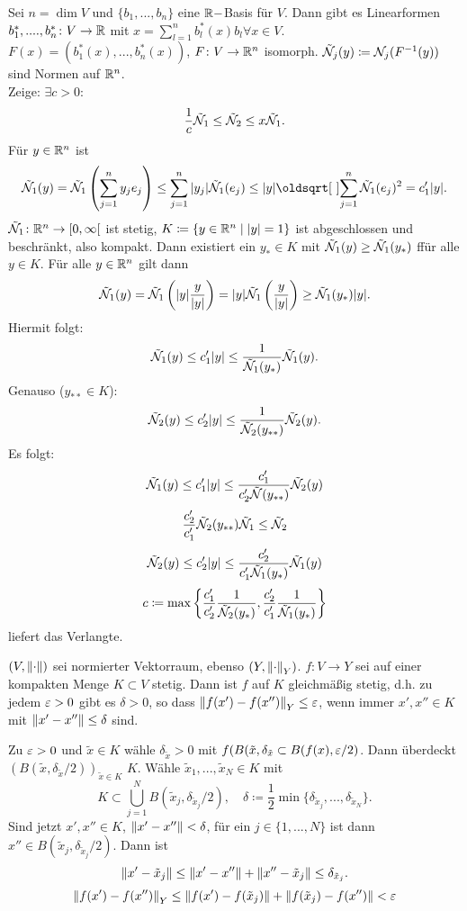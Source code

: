 \begin{beweis}
	Sei $ n=\dim V $ und $ \lbrace b_1,...,b_n\rbrace $ eine $ \mathbb{R}- $Basis f\"ur $ V $. Dann gibt es Linearformen $ b_1^\ast,....,b_n^\ast\colon V\rightarrow\mathbb{R} $ mit $ x=\sum_{l=1}^n b_l^\ast(x) b_l\forall x\in V $.\\
	$ F(x)=(b_1^\ast(x),...,b_n^\ast(x)) $, $ F\colon V\rightarrow\mathbb{R}^n $ isomorph. $ \tilde{\mathcal N}_j(y)\coloneqq\mathcal N_j(F^{-1}(y)) $ sind Normen auf $ \mathbb{R}^n $.\\
	Zeige: $ \exists c>0: $
	\[ \frac{1}{c}\tilde{\mathcal N}_1\leq\tilde{\mathcal N}_2\leq x\tilde{\mathcal N}_1. \]
	F\"ur $ y\in\mathbb{R}^n $ ist
	\[ \tilde\sN_1(y)=\tilde\sN_1\left(\sum_{j=1}^n y_j e_j\right)\leq\sum_{j=1}^n|y_j|\tilde\sN_1(e_j)\leq|y|\sqrt{\sum_{j=1}^{n}\tilde\sN_1(e_j)^2}=c_1'|y|. \]
	$ \tilde{\mathcal N}_1\colon\mathbb{R}^n\rightarrow[0,\infty[ $ ist stetig, $ K\coloneqq\lbrace y\in\mathbb{R}^n\mid |y|=1\rbrace $ ist abgeschlossen und beschr\"ankt, also kompakt. Dann existiert ein $ y_\ast\in K $ mit $ \tilde{\mathcal N}_1(y)\geq\tilde{\mathcal N}_1(y_\ast) $ ff\"ur alle $ y\in K $. F\"ur alle $ y\in\mathbb{R}^n $ gilt dann
	\[ \tilde{\mathcal N}_1(y)=\tilde{\mathcal N}_1\left(|y|\frac{y}{|y|}\right)=|y|\tilde{\mathcal N}_1\left(\frac{y}{|y|}\right)\geq\tilde{\mathcal N}_1(y_\ast)|y|. \]
	Hiermit folgt:
	\[ \tilde{\mathcal N}_1(y)\leq c_1'|y|\leq\frac{1}{\tilde{\mathcal N}_1(y_\ast)}\tilde{\mathcal N}_1(y). \]
	Genauso ($ y_{\ast\ast}\in K $):
	\[ \tilde{\mathcal N}_2(y)\leq c'_2|y|\leq\frac{1}{\tilde{\mathcal N}_2(y_{\ast\ast})}\tilde{\mathcal N}_2(y). \]
	Es folgt:
	\[ \tilde{\mathcal N}_1(y)\leq c_1'|y|\leq\frac{c_1'}{c_2'\tilde{\mathcal N}(y_{\ast\ast})}\tilde{\mathcal N}_2(y) \]
	\[ \frac{c_2'}{c_1'}\tilde{\mathcal N}_2(y_{\ast\ast})\tilde{\mathcal N}_1\leq\tilde{\mathcal N}_2 \]
	\[ \tilde{\mathcal N}_2(y)\leq c_2'|y|\leq\frac{c_2'}{c_1'\tilde{\mathcal N}_1(y_\ast)}\tilde{\mathcal N}_1(y) \]
	\[ c\coloneqq\max\left\lbrace\frac{c_1'}{c_2'}\frac{1}{\tilde{\mathcal N}_2(y_\ast)},\frac{c_2'}{c_1'}\frac{1}{\tilde{\mathcal N}_1(y_\ast)}\right\rbrace \]
	liefert das Verlangte.
\end{beweis}
\begin{lemma}
	$ (V,\left\|\cdot\right\|) $ sei normierter Vektorraum, ebenso $ (Y,\left\|\cdot\right\|_Y) $. $ f\colon V\rightarrow Y $ sei auf einer kompakten Menge $ K\subset V $ stetig. Dann ist $ f $ auf $ K $ gleichm\"a\ss ig stetig, d.h. zu jedem $ \varepsilon>0 $ gibt es $ \delta>0 $, so dass $ \left\|f(x')-f(x'')\right\|_Y\leq\varepsilon $, wenn immer $ x',x''\in K $ mit $ \left\|x'-x''\right\|\leq\delta $ sind.
\end{lemma}
\begin{beweis}
	Zu $ \varepsilon>0 $ und $ \tilde x\in K $ w\"ahle $ \delta_{\tilde x} >0$ mit $ f(B(\tilde x,\delta_{\tilde x}\subset B(f(x),\varepsilon/2) $. Dann \"uberdeckt $ (B(\tilde x,\delta_{\tilde x}/2))_{\tilde x\in K} $ $ K $. W\"ahle $ \tilde x_1,...,\tilde x_N\in K $ mit \[ K\subset\bigcup_{j=1}^NB(\tilde x_j,\delta_{\tilde x_j}/2),\quad \delta\coloneqq\frac{1}{2}\min\lbrace\delta_{\tilde x_j},...,\delta_{\tilde x_N}\rbrace. \]
	Sind jetzt $ x',x''\in K $, $ \left\|x'-x''\right\|<\delta $, f\"ur ein $ j\in\lbrace 1,...,N\rbrace $ ist dann $ x''\in B(\tilde x_j,\delta_{\tilde x_j}/2) $. Dann ist
	\[ \left\|x'-\tilde x_j\right\|\leq\left\|x'-x''\right\|+\left\|x''-\tilde x_{j}\right\|\leq\delta_{\tilde x_j}. \]
	\[ \left\|f(x')-f(x'')\right\|_Y\leq\left\|f(x')-f(\tilde x_j)\right\|+\left\|f(\tilde x_j)-f(x'')\right\|<\varepsilon \]
\end{beweis}
